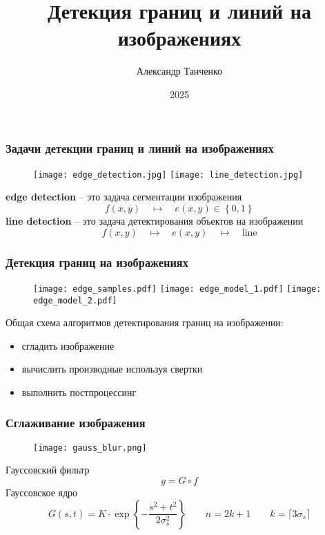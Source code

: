 \documentclass[
    12pt, 
    usepdftitle=false,
    aspectratio=1610
]{beamer}
\title[Лекция 4]{Детекция границ и линий на изображениях}
\author{Александр Танченко}
\institute{}
\date{2025}
\begin{document}
\begin{frame}
    \titlepage
\end{frame}

\begin{frame}
\frametitle{Задачи детекции границ и линий на изображениях}
\begin{figure}
    \centering
    \texttt{[image: edge\_detection.jpg]}
    \texttt{[image: line\_detection.jpg]}
\end{figure}
\textbf{edge detection} -- это задача сегментации изображения
$$
   f(x,y)\quad\mapsto\quad e(x,y)\in\left\{0,1\right\}
$$
\textbf{line detection} -- это задача детектирования объектов на изображении
$$
    f(x,y)\quad\mapsto\quad e(x,y)\quad\mapsto\quad\mbox{line}
$$
\end{frame}

\begin{frame}
    \frametitle{Детекция границ на изображениях}
\begin{figure}
    \centering
    \texttt{[image: edge\_samples.pdf]}
    \texttt{[image: edge\_model\_1.pdf]}
    \hspace*{3cm}
    \texttt{[image: edge\_model\_2.pdf]}
\end{figure}
Общая схема алгоритмов детектирования границ на изображении:
\begin{itemize}
    \item сгладить изображение
    \item вычислить производные используя свертки
    \item выполнить постпроцессинг
\end{itemize}
\end{frame}

\begin{frame}
\frametitle{Сглаживание изображения}
\begin{figure}
    \centering
    \texttt{[image: gauss\_blur.png]}
\end{figure}
Гауссовский фильтр
$$
    g=G\circ f
$$
Гауссовское ядро
$$
    G(s,t)=K\cdot\exp\left\{-\frac{s^2+t^2}{2\sigma_s^2}\right\}
    \qquad n=2k+1
    \qquad k=\lceil 3\sigma_s \rceil
$$
\end{frame}
\end{document}
